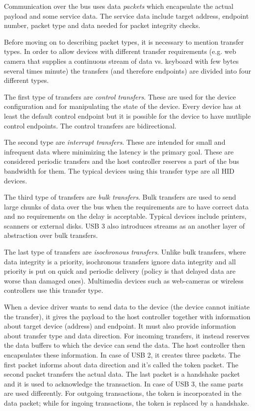 Communication over the bus uses data \textit{packets} which encapsulate the
actual payload and some service data. The service data include target address,
endpoint number, packet type and data needed for packet integrity checks.

Before moving on to describing packet types, it is necessary to mention
transfer types. In order to allow devices with different transfer requirements
(e.g. web camera that supplies a continuous stream of data vs. keyboard with
few bytes several times minute) the transfers (and therefore endpoints) are
divided into four different types.

The first type of transfers are \textit{control transfers}. These are used for
the device configuration and for manipulating the state of the device. Every
device has at least the default control endpoint but it is possible for the
device to have mutliple control endpoints. The control transfers are
bidirectional.

The second type are \textit{interrupt transfers}. These are intended for small
and infrequent data where minimizing the latency is the primary goal. These are
considered periodic transfers and the host controller reserves a part of the
bus bandwidth for them. The typical devices using this transfer type are all
HID devices.

The third type of transfers are \textit{bulk transfers}. Bulk transfers are
used to send large chunks of data over the bus when the requirements are to
have correct data and no requirements on the delay is acceptable. Typical
devices include printers, scanners or external disks. USB 3 also introduces
streams as an another layer of abstraction over bulk transfers.

The last type of transfers are \textit{isochronous transfers}. Unlike bulk
transfers, where data integrity is a priority, isochronous transfers ignore
data integrity and all priority is put on quick and periodic delivery (policy
is that delayed data are worse than damaged ones). Multimedia devices such as
web-cameras or wireless controllers use this transfer type.

When a device driver wants to send data to the device (the device cannot
initiate the transfer), it gives the payload to the host controller together
with information about target device (address) and endpoint. It must also
provide information about transfer type and data direction. For incoming
transfers, it instead reserves the data buffers to which the device can send
the data. The host controller then encapsulates these information. In case of
USB 2, it creates three packets. The first packet informs about data direction
and it's called the token packet. The second packet transfers the actual data.
The last packet is a handshake packet and it is used to acknowledge the
transaction. In case of USB 3, the same parts are used differently. For
outgoing transactions, the token is incorporated in the data packet; while for
ingoing transactions, the token is replaced by a handshake.

